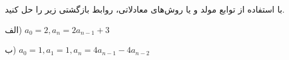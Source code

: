\EXERCISE
با استفاده از توابع مولد و یا روش‌های معادلاتی، روابط بازگشتی زیر را حل کنید.

الف)
$a_0 = 2, a_n = 2a_{n-1} + 3$

ب)
$a_0 = 1, a_1 = 1, a_n = 4a_{n-1} - 4a_{n-2}$
